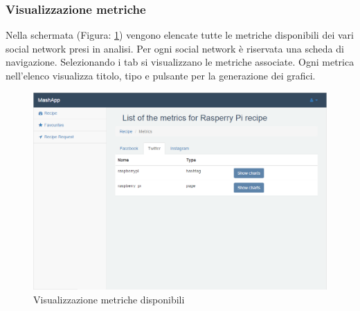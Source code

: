 		\subsubsection{Visualizzazione metriche} %
		\label{sec:visualizzazione_metriche}
			Nella schermata (Figura: \ref{fig:visualizzazione_metriche}) vengono elencate tutte le metriche\gloss{} disponibili dei vari social network\gloss{} presi in analisi.\newline
			Per ogni social network\gloss{} è riservata una scheda di navigazione. Selezionando i tab si visualizzano le metriche\gloss{} associate.\newline
			Ogni metrica\gloss{} nell'elenco visualizza titolo, tipo e pulsante per la generazione dei grafici.
			\begin{figure}[H]
				\centering
				\centerline{\includegraphics[width=14cm]{images/visualizzazione_metriche.png}}
				\caption{Visualizzazione metriche disponibili}
				\label{fig:visualizzazione_metriche}
			\end{figure}


